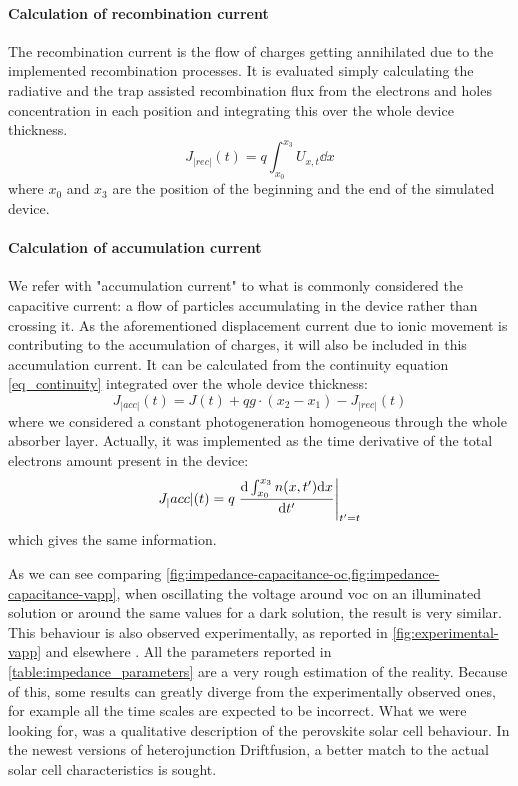 	\paragraph{Calculation of recombination current}\label{impedance_recombination}
	The recombination current is the flow of charges getting annihilated due to the implemented recombination processes.
	It is evaluated simply calculating the radiative and the trap assisted recombination flux from the electrons and holes concentration in each position and integrating this over the whole device thickness.
	\begin{equation}
		J_|rec|(t) = q \int_{x_0}^{x_3} U_{x,t} \dd x
	\end{equation}
	where $x_0$ and $x_3$ are the position of the beginning and the end of the simulated device.

	\paragraph{Calculation of accumulation current}\label{impedance_accumulation}
	We refer with "accumulation current" to what is commonly considered the capacitive current: a flow of particles accumulating in the device rather than crossing it.
	As the aforementioned displacement current due to ionic movement is contributing to the accumulation of charges, it will also be included in this accumulation current.
	It can be calculated from the continuity equation \cref{eq_continuity} integrated over the whole device thickness:
	\begin{equation}
		J_|acc|(t) = J(t) + qg \cdot (x_2-x_1) - J_|rec|(t)
	\end{equation}
	where we considered a constant photogeneration homogeneous through the whole absorber layer.
	Actually, it was implemented as the time derivative of the total electrons amount present in the device:
	\begin{equation}
		J_|acc|(t) = q\eval{\dv{\int_{x_0}^{x_3} n(x,t') \dd x}{t'}}_{t'=t}
	\end{equation}
	which gives the same information.



	As we can see comparing \cref{fig:impedance-capacitance-oc,fig:impedance-capacitance-vapp}, when oscillating the voltage around \gls{voc} on an illuminated solution or around the same values for a dark solution, the result is very similar.
	This behaviour is also observed experimentally, as reported in \cref{fig:experimental-vapp} and elsewhere \cite{Ebadi2019,Tress2015, }.
	All the parameters reported in \cref{table:impedance_parameters} are a very rough estimation of the reality.
	Because of this, some results can greatly diverge from the experimentally observed ones, for example all the time scales are expected to be incorrect.
	What we were looking for, was a qualitative description of the perovskite solar cell behaviour.
	In the newest versions of heterojunction Driftfusion, a better match to the actual solar cell characteristics is sought.

